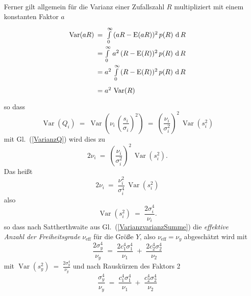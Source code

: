Ferner gilt allgemein für die Varianz einer Zufallszahl $R$
multipliziert mit einem konstanten Faktor $a$
\begin{equation}
\arraycolsep=2.4pt\def\arraystretch{2}
\begin{array}{ll}
\operatorname{Var}(a R) & = \; \int\limits_0^\infty \, (a R - \operatorname{E}(a R))^2  \, p(R)  \, \operatorname{d}R \\
 & = \int\limits_0^\infty \, a^2 \, (R - \operatorname{E}(R))^2  \, p(R)  \, \operatorname{d}R\\
 & = a^2 \, \int\limits_0^\infty \, (R - \operatorname{E}(R))^2  \, p(R)  \, \operatorname{d}R\\
 & = a^2 \, \operatorname{Var}(R)
\end{array}
\end{equation}
so dass
\begin{equation}
\operatorname{Var}(Q_i) \; = \; \operatorname{Var}\left(\nu_i \, \left(\frac{s_i}{\sigma_i}\right)^2\right)
 \; = \; \left(\frac{\nu_i}{\sigma_i^2}\right)^2 \, \operatorname{Var}(s_i^2)
\end{equation}
mit Gl.~(\ref{VarianzQ}) wird dies zu
\begin{equation}
2 \nu_i \; = \; \left(\frac{\nu_i}{\sigma_i^2}\right)^2 \, \operatorname{Var}(s_i^2) .
\end{equation}
 Das heißt
\begin{equation}
2 \nu_i \; = \; \frac{\nu_i^2}{\sigma_i^4} \, \operatorname{Var}(s_i^2)
\end{equation}
also
\begin{equation}
\operatorname{Var}(s_i^2) \; = \; \frac{2 \sigma_i^4}{\nu_i} .
\end{equation}
so dass nach Sattherthwaite aus Gl.~(\ref{VarianzvarianzSumme}) die \textsl{effektive Anzahl
der Freiheitsgrade} $\nu_\mathrm{eff}$ für die Größe $Y$, also $\nu_\mathrm{eff} = \nu_y$
abgeschätzt wird mit
$$
\frac{2 \sigma_y^4}{\nu_y} \; = \;  \frac{2 c_1^4 \sigma_1^4}{\nu_1} 
 \; + \; \frac{2 c_2^4 \sigma_2^4}{\nu_2}
$$
mit $\operatorname{Var}(s_y^2) \; = \; \frac{2 \sigma_y^4}{\nu_y}$ 
und nach Rauskürzen des Faktors 2
\begin{equation}
\frac{\sigma_y^4}{\nu_y} \; = \;  \frac{c_1^4 \sigma_1^4}{\nu_1} 
 \; + \; \frac{c_2^4 \sigma_2^4}{\nu_2}
\label{Satterthwaite}
\end{equation}
